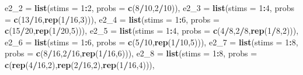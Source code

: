 \documentclass[,man,floatsintext]{apa6}
\newenvironment{Shaded}{\begin{snugshade}}{\end{snugshade}}
\newcommand{\DataTypeTok}[1]{\textcolor[rgb]{0.13,0.29,0.53}{#1}}
\newcommand{\DecValTok}[1]{\textcolor[rgb]{0.00,0.00,0.81}{#1}}
\newcommand{\KeywordTok}[1]{\textcolor[rgb]{0.13,0.29,0.53}{\textbf{#1}}}
\newcommand{\NormalTok}[1]{#1}
\newcommand{\OperatorTok}[1]{\textcolor[rgb]{0.81,0.36,0.00}{\textbf{#1}}}
\begin{document}
\begin{Shaded}
\begin{Highlighting}[]
  \DataTypeTok{e2_2 =} \KeywordTok{list}\NormalTok{(}\DataTypeTok{stims =} \DecValTok{1}\OperatorTok{:}\DecValTok{2}\NormalTok{,}
              \DataTypeTok{probs =} \KeywordTok{c}\NormalTok{(}\DecValTok{8}\OperatorTok{/}\DecValTok{10}\NormalTok{,}\DecValTok{2}\OperatorTok{/}\DecValTok{10}\NormalTok{)),}
  \DataTypeTok{e2_3 =} \KeywordTok{list}\NormalTok{(}\DataTypeTok{stims =} \DecValTok{1}\OperatorTok{:}\DecValTok{4}\NormalTok{,}
              \DataTypeTok{probs =} \KeywordTok{c}\NormalTok{(}\DecValTok{13}\OperatorTok{/}\DecValTok{16}\NormalTok{,}\KeywordTok{rep}\NormalTok{(}\DecValTok{1}\OperatorTok{/}\DecValTok{16}\NormalTok{,}\DecValTok{3}\NormalTok{))),}
  \DataTypeTok{e2_4 =} \KeywordTok{list}\NormalTok{(}\DataTypeTok{stims =} \DecValTok{1}\OperatorTok{:}\DecValTok{6}\NormalTok{,}
              \DataTypeTok{probs =} \KeywordTok{c}\NormalTok{(}\DecValTok{15}\OperatorTok{/}\DecValTok{20}\NormalTok{,}\KeywordTok{rep}\NormalTok{(}\DecValTok{1}\OperatorTok{/}\DecValTok{20}\NormalTok{,}\DecValTok{5}\NormalTok{))),}
  \DataTypeTok{e2_5 =} \KeywordTok{list}\NormalTok{(}\DataTypeTok{stims =} \DecValTok{1}\OperatorTok{:}\DecValTok{4}\NormalTok{,}
              \DataTypeTok{probs =} \KeywordTok{c}\NormalTok{(}\DecValTok{4}\OperatorTok{/}\DecValTok{8}\NormalTok{,}\DecValTok{2}\OperatorTok{/}\DecValTok{8}\NormalTok{,}\KeywordTok{rep}\NormalTok{(}\DecValTok{1}\OperatorTok{/}\DecValTok{8}\NormalTok{,}\DecValTok{2}\NormalTok{))),}
  \DataTypeTok{e2_6 =} \KeywordTok{list}\NormalTok{(}\DataTypeTok{stims =} \DecValTok{1}\OperatorTok{:}\DecValTok{6}\NormalTok{,}
              \DataTypeTok{probs =} \KeywordTok{c}\NormalTok{(}\DecValTok{5}\OperatorTok{/}\DecValTok{10}\NormalTok{,}\KeywordTok{rep}\NormalTok{(}\DecValTok{1}\OperatorTok{/}\DecValTok{10}\NormalTok{,}\DecValTok{5}\NormalTok{))),}
  \DataTypeTok{e2_7 =} \KeywordTok{list}\NormalTok{(}\DataTypeTok{stims =} \DecValTok{1}\OperatorTok{:}\DecValTok{8}\NormalTok{,}
              \DataTypeTok{probs =} \KeywordTok{c}\NormalTok{(}\DecValTok{8}\OperatorTok{/}\DecValTok{16}\NormalTok{,}\DecValTok{2}\OperatorTok{/}\DecValTok{16}\NormalTok{,}\KeywordTok{rep}\NormalTok{(}\DecValTok{1}\OperatorTok{/}\DecValTok{16}\NormalTok{,}\DecValTok{6}\NormalTok{))),}
  \DataTypeTok{e2_8 =} \KeywordTok{list}\NormalTok{(}\DataTypeTok{stims =} \DecValTok{1}\OperatorTok{:}\DecValTok{8}\NormalTok{,}
              \DataTypeTok{probs =} \KeywordTok{c}\NormalTok{(}\KeywordTok{rep}\NormalTok{(}\DecValTok{4}\OperatorTok{/}\DecValTok{16}\NormalTok{,}\DecValTok{2}\NormalTok{),}\KeywordTok{rep}\NormalTok{(}\DecValTok{2}\OperatorTok{/}\DecValTok{16}\NormalTok{,}\DecValTok{2}\NormalTok{),}\KeywordTok{rep}\NormalTok{(}\DecValTok{1}\OperatorTok{/}\DecValTok{16}\NormalTok{,}\DecValTok{4}\NormalTok{))),}

\end{Highlighting}
\end{Shaded}
\end{document}
